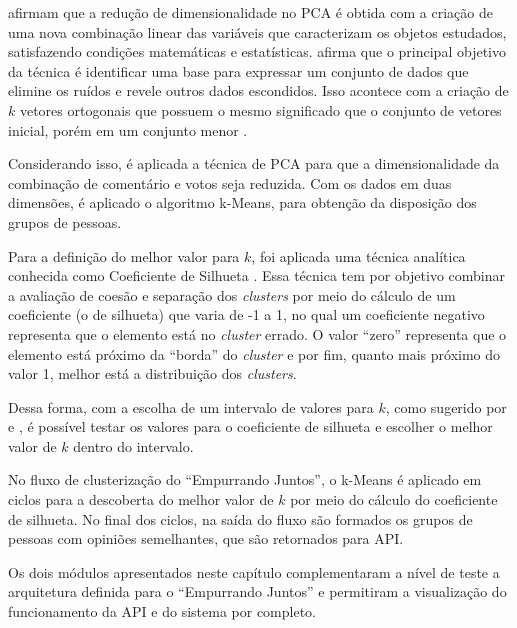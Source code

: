      afirmam que a redução de dimensionalidade no PCA é
    obtida com a criação de uma nova combinação linear das variáveis que caracterizam os
    objetos estudados, satisfazendo condições matemáticas e estatísticas.
     afirma que o principal objetivo da técnica é identificar
    uma base para expressar um conjunto de dados que elimine os ruídos e revele 
    outros dados escondidos. Isso acontece com a criação de $k$ vetores ortogonais que possuem o mesmo significado que o conjunto
    de vetores inicial, porém em um conjunto menor \cite{han2011data}. 
    
    Considerando isso, é aplicada a técnica de PCA para que
    a dimensionalidade da combinação de comentário e votos seja reduzida. 
    Com os dados em duas dimensões, é aplicado o algoritmo k-Means, para obtenção da disposição dos grupos de pessoas. 
    
    Para a definição do melhor valor para $k$, foi aplicada uma técnica analítica conhecida como Coeficiente de Silhueta \cite{sklearn}.  
    Essa técnica tem por objetivo combinar a avaliação de coesão e separação dos \textit{clusters} por meio do cálculo de um coeficiente (o de silhueta) que 
    varia de -1 a 1, no qual um coeficiente negativo representa que o elemento está no \textit{cluster} errado.
    O valor ``zero'' representa que o elemento está próximo da ``borda'' do \textit{cluster} e por fim, quanto mais próximo do valor 1, melhor
    está a distribuição dos \textit{clusters}.

    Dessa forma, com a escolha de um intervalo de valores para $k$, como sugerido por  e , é possível testar os valores 
    para o coeficiente de silhueta e escolher o melhor valor de $k$ dentro do intervalo. 

    No fluxo de clusterização do ``Empurrando Juntos'', o k-Means é aplicado em ciclos para a descoberta do melhor valor de 
    $k$ por meio do cálculo do coeficiente de silhueta.
    No final dos ciclos, na saída do fluxo são formados os grupos de pessoas com opiniões semelhantes, que são retornados para API.
 
    Os dois módulos apresentados neste capítulo complementaram a nível de teste a arquitetura definida para o ``Empurrando Juntos'' e permitiram 
    a visualização do funcionamento da API e do sistema por completo.